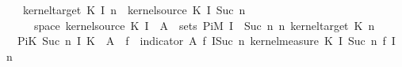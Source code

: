 \begin{isabellebody}
\ \ \ \ {\isachardoublequoteopen}kernel{\isacharunderscore}{\kern0pt}target\ {\isacharparenleft}{\kern0pt}K\ {\isacharparenleft}{\kern0pt}I\ n{\isacharparenright}{\kern0pt}{\isacharparenright}{\kern0pt}\ {\isacharequal}{\kern0pt}\ kernel{\isacharunderscore}{\kern0pt}source\ {\isacharparenleft}{\kern0pt}K\ {\isacharparenleft}{\kern0pt}I\ {\isacharparenleft}{\kern0pt}Suc\ n{\isacharparenright}{\kern0pt}{\isacharparenright}{\kern0pt}{\isacharparenright}{\kern0pt}{\isachardoublequoteclose}\isanewline
\ \ \ \ {\isachardoublequoteopen}{\isasymomega}\ {\isasymin}\ space\ {\isacharparenleft}{\kern0pt}kernel{\isacharunderscore}{\kern0pt}source\ {\isacharparenleft}{\kern0pt}K\ {\isacharparenleft}{\kern0pt}I\ {}{\isacharparenright}{\kern0pt}{\isacharparenright}{\kern0pt}{\isacharparenright}{\kern0pt}{\isachardoublequoteclose}\ {\isachardoublequoteopen}A{\isacharprime}{\kern0pt}\ {\isasymin}\ sets\ {\isacharparenleft}{\kern0pt}PiM\ {\isacharparenleft}{\kern0pt}I\ {\isacharbackquote}{\kern0pt}\ {\isacharbraceleft}{\kern0pt}{}{\isachardot}{\kern0pt}{\isachardot}{\kern0pt}Suc\ n{\isacharbraceright}{\kern0pt}{\isacharparenright}{\kern0pt}\ {\isacharparenleft}{\kern0pt}{\isasymlambda}n{\isachardot}{\kern0pt}\ kernel{\isacharunderscore}{\kern0pt}target\ {\isacharparenleft}{\kern0pt}K\ n{\isacharparenright}{\kern0pt}{\isacharparenright}{\kern0pt}{\isacharparenright}{\kern0pt}{\isachardoublequoteclose}\isanewline
\ \ \ {\isachardoublequoteopen}PiK\ {\isacharparenleft}{\kern0pt}Suc\ n{\isacharparenright}{\kern0pt}\ I\ K\ {\isasymomega}\ A{\isacharprime}{\kern0pt}\ {\isacharequal}{\kern0pt}\ {\isacharparenleft}{\kern0pt}{\isasymintegral}\isactrlsup {\isacharplus}{\kern0pt}{\isasymomega}\isactrlsub f{\isachardot}{\kern0pt}\ {\isacharparenleft}{\kern0pt}{\isasymintegral}\isactrlsup {\isacharplus}{\kern0pt}{\isasymomega}{\isachardot}{\kern0pt}\ indicator\ A{\isacharprime}{\kern0pt}\ {\isacharparenleft}{\kern0pt}{\isasymomega}\isactrlsub f\ {\isacharparenleft}{\kern0pt}I{\isacharparenleft}{\kern0pt}Suc\ n{\isacharparenright}{\kern0pt}{\isacharcolon}{\kern0pt}{\isacharequal}{\kern0pt}{\isasymomega}{\isacharparenright}{\kern0pt}{\isacharparenright}{\kern0pt}\ {\isasympartial}kernel{\isacharunderscore}{\kern0pt}measure\ {\isacharparenleft}{\kern0pt}K\ {\isacharparenleft}{\kern0pt}I\ {\isacharparenleft}{\kern0pt}Suc\ n{\isacharparenright}{\kern0pt}{\isacharparenright}{\kern0pt}{\isacharparenright}{\kern0pt}\ {\isacharparenleft}{\kern0pt}{\isasymomega}\isactrlsub f\ {\isacharparenleft}{\kern0pt}I\ n{\isacharparenright}{\kern0pt}{\isacharparenright}{\kern0pt}{\isacharparenright}{\kern0pt}\isanewline

\end{isabellebody}
